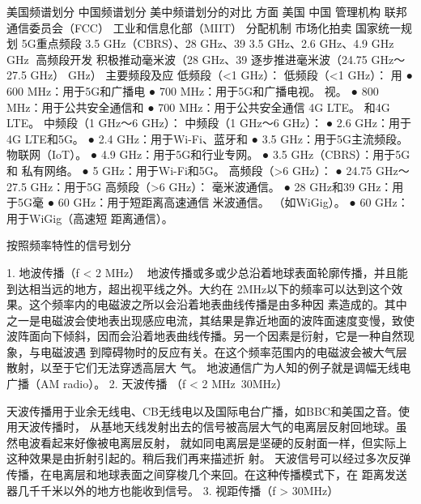 美国频谱划分                            中国频谱划分
美中频谱划分的对比
 方面     美国                           中国
 管理机构   联邦通信委员会（FCC）                 工业和信息化部（MIIT）
 分配机制   市场化拍卖                        国家统一规划
 5G重点频段 3.5 GHz（CBRS）、28 GHz、39      3.5 GHz、2.6 GHz、4.9 GHz
        GHz
高频段开发  积极推动毫米波（28 GHz、39              逐步推进毫米波（24.75 GHz～27.5
       GHz）                           GHz）
主要频段及应 低频段（<1 GHz）：                   低频段（<1 GHz）：
用       ● 600 MHz：用于5G和广播电             ● 700 MHz：用于5G和广播电视。
          视。                           ● 800 MHz：用于公共安全通信和
        ● 700 MHz：用于公共安全通信               4G LTE。
          和4G LTE。
                                     中频段（1 GHz～6 GHz）：
              中频段（1 GHz～6 GHz）：       ● 2.6 GHz：用于4G LTE和5G。
               ● 2.4 GHz：用于Wi-Fi、蓝牙和  ● 3.5 GHz：用于5G主流频段。
                 物联网（IoT）。            ● 4.9 GHz：用于5G和行业专网。
               ● 3.5 GHz（CBRS）：用于5G和
                 私有网络。
               ● 5 GHz：用于Wi-Fi和5G。
                                     高频段（>6 GHz）：
                                      ● 24.75 GHz～27.5 GHz：用于5G
              高频段（>6 GHz）：              毫米波通信。
               ● 28 GHz和39 GHz：用于5G毫
                                      ● 60 GHz：用于短距离高速通信
                 米波通信。                  （如WiGig）。
               ● 60 GHz：用于WiGig（高速短
                 距离通信）。

按照频率特性的信号划分




1.   地波传播（f < 2 MHz）
地波传播或多或少总沿着地球表面轮廓传播，并且能到达相当远的地方，超出视平线之外。大约在
2MHz以下的频率可以达到这个效果。这个频率内的电磁波之所以会沿着地表曲线传播是由多种因
素造成的。其中之一是电磁波会使地表出现感应电流，其结果是靠近地面的波阵面速度变慢，致使
波阵面向下倾斜，因而会沿着地表曲线传播。另一个因素是衍射，它是一种自然现象，与电磁波遇
到障碍物时的反应有关。在这个频率范围内的电磁波会被大气层散射，以至于它们无法穿透高层大
气。 地波通信广为人知的例子就是调幅无线电广播（AM radio）。
 2. 天波传播 （f < 2 MHz~30MHz）

天波传播用于业余无线电、CB无线电以及国际电台广播，如BBC和美国之音。使用天波传播时，
从基地天线发射出去的信号被高层大气的电离层反射回地球。虽然电波看起来好像被电离层反射，
就如同电离层是坚硬的反射面一样，但实际上这种效果是由折射引起的。稍后我们再来描述折
射。
天波信号可以经过多次反弹传播，在电离层和地球表面之间穿梭几个来回。在这种传播模式下，在
距离发送器几千千米以外的地方也能收到信号。
 3. 视距传播（f > 30MHz）

